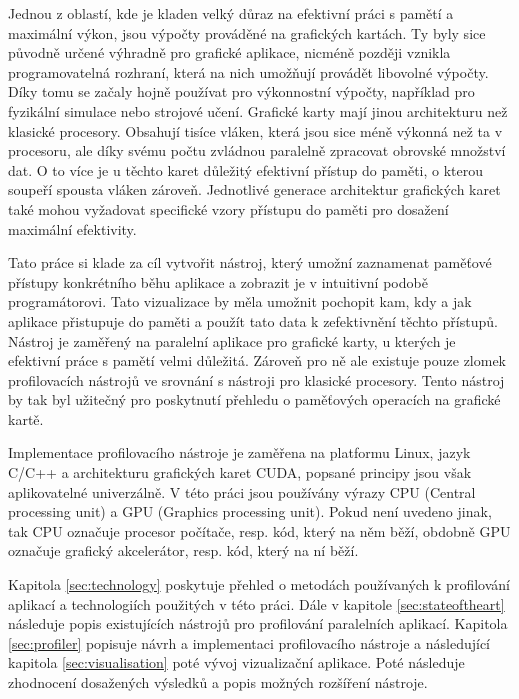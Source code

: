 Jednou z oblastí, kde je kladen velký důraz na efektivní práci s pamětí a maximální výkon, jsou výpočty prováděné na grafických kartách. Ty byly sice původně určené výhradně pro grafické aplikace, nicméně později vznikla programovatelná rozhraní, která na nich umožňují provádět libovolné výpočty. Díky tomu se začaly hojně používat pro výkonnostní výpočty, například pro fyzikální simulace nebo strojové učení. Grafické karty mají jinou architekturu než klasické procesory. Obsahují tisíce vláken, která jsou sice méně výkonná než ta v procesoru, ale díky svému počtu zvládnou paralelně zpracovat obrovské množství dat. O to více je u těchto karet důležitý efektivní přístup do paměti, o kterou soupeří spousta vláken zároveň. Jednotlivé generace architektur grafických karet také mohou vyžadovat specifické vzory přístupu do paměti pro dosažení maximální efektivity.

Tato práce si klade za cíl vytvořit nástroj, který umožní zaznamenat paměťové přístupy konkrétního běhu aplikace a zobrazit je v intuitivní podobě programátorovi. Tato vizualizace by měla umožnit pochopit kam, kdy a jak aplikace přistupuje do paměti a použít tato data k zefektivnění těchto přístupů. Nástroj je zaměřený na paralelní aplikace pro grafické karty, u kterých je efektivní práce s pamětí velmi důležitá. Zároveň pro ně ale existuje pouze zlomek profilovacích nástrojů ve srovnání s nástroji pro klasické procesory. Tento nástroj by tak byl užitečný pro poskytnutí přehledu o paměťových operacích na grafické kartě.

Implementace profilovacího nástroje je zaměřena na platformu Linux, jazyk C/C++ a architekturu grafických karet CUDA, popsané principy jsou však aplikovatelné univerzálně. V této práci jsou používány výrazy CPU (Central processing unit) a GPU (Graphics processing unit). Pokud není uvedeno jinak, tak CPU označuje procesor počítače, resp. kód, který na něm běží, obdobně GPU označuje grafický akcelerátor, resp. kód, který na ní běží.

Kapitola \ref{sec:technology} poskytuje přehled o metodách používaných k profilování aplikací a technologiích použitých v této práci. Dále v kapitole \ref{sec:stateoftheart} následuje popis existujících nástrojů pro profilování paralelních aplikací. Kapitola \ref{sec:profiler} popisuje návrh a implementaci profilovacího nástroje a následující kapitola \ref{sec:visualisation} poté vývoj vizualizační aplikace. Poté následuje zhodnocení dosažených výsledků a popis možných rozšíření nástroje. 

